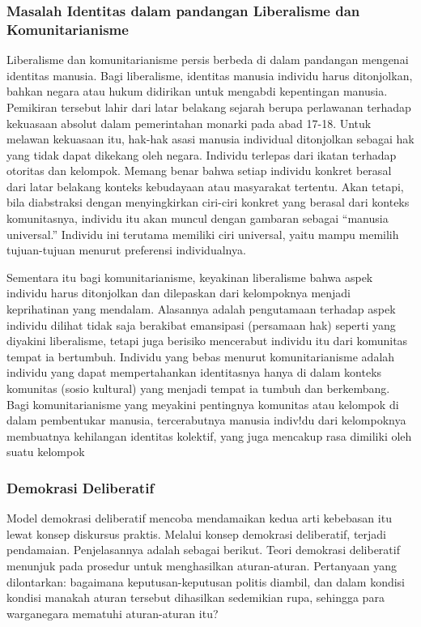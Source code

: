 \documentclass[10pt,a4paper]{article}
\begin{document}
\begin{multicols}{2}
{\subsubsection{Masalah Identitas dalam pandangan Liberalisme dan
Komunitarianisme}\label{masalah-identitas-dalam-pandangan-liberalisme-dan-komunitarianisme}}

Liberalisme dan komunitarianisme persis berbeda di dalam pandangan
mengenai identitas manusia. Bagi liberalisme, identitas manusia individu
harus ditonjolkan, bahkan negara atau hukum didirikan untuk mengabdi
kepentingan manusia. Pemikiran tersebut lahir dari latar belakang
sejarah berupa perlawanan terhadap kekuasaan absolut dalam pemerintahan
monarki pada abad 17-18. Untuk melawan kekuasaan itu, hak-hak asasi
manusia individual ditonjolkan sebagai hak yang tidak dapat dikekang
oleh negara. Individu terlepas dari ikatan terhadap otoritas dan
kelompok. Memang benar bahwa setiap individu konkret berasal dari latar
belakang konteks kebudayaan atau masyarakat tertentu. Akan tetapi, bila
diabstraksi dengan menyingkirkan ciri-ciri konkret yang berasal dari
konteks komunitasnya, individu itu akan muncul dengan gambaran sebagai
``manusia universal.'' Individu ini terutama memiliki ciri universal,
yaitu mampu memilih tujuan-tujuan menurut preferensi individualnya.

Sementara itu bagi komunitarianisme, keyakinan liberalisme bahwa aspek
individu harus ditonjolkan dan dilepaskan dari kelompoknya menjadi
keprihatinan yang mendalam. Alasannya adalah pengutamaan terhadap aspek
individu dilihat tidak saja berakibat emansipasi (persamaan hak) seperti
yang diyakini liberalisme, tetapi juga berisiko mencerabut individu itu
dari komunitas tempat ia bertumbuh. Individu yang bebas menurut
komunitarianisme adalah individu yang dapat mempertahankan identitasnya
hanya di dalam konteks komunitas (sosio kultural) yang menjadi tempat ia
tumbuh dan berkembang. Bagi komunitarianisme yang meyakini pentingnya
komunitas atau kelompok di dalam pembentukar manusia, tercerabutnya
manusia indiv!du dari kelompoknya membuatnya kehilangan identitas
kolektif, yang juga mencakup rasa dimiliki oleh suatu kelompok

\hypertarget{demokrasi-deliberatif}{%
\subsubsection{Demokrasi Deliberatif}\label{demokrasi-deliberatif}}

Model demokrasi deliberatif mencoba mendamaikan kedua arti kebebasan itu
lewat konsep diskursus praktis. Melalui konsep demokrasi deliberatif,
terjadi pendamaian. Penjelasannya adalah sebagai berikut. Teori
demokrasi deliberatif menunjuk pada prosedur untuk menghasilkan
aturan-aturan. Pertanyaan yang dilontarkan: bagaimana
keputusan-keputusan politis diambil, dan dalam kondisi kondisi manakah
aturan tersebut dihasilkan sedemikian rupa, sehingga para warganegara
mematuhi aturan-aturan itu?


\end{multicols}
\end{document}
